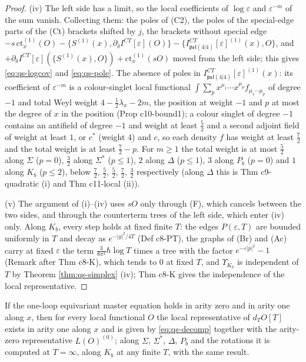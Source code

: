 \begin{proof}
(iv) The left side has a limit, so the local coefficients of $\log\varepsilon$ and $\varepsilon^{-m}$ of the sum vanish. Collecting them: the poles of (C2), the poles of the special-edge parts of the (Ct) brackets shifted by $j$, the brackets without special edge $-s\,\mathrm{ct}^{(1)}_x(O)-\{S^{(1)}(x),\partial_\delta I^{CT}[\varepsilon](O)\}-\{I^{CT}_{\mathfrak{psl}(4|4)}[\varepsilon]^{(1)}(x),O\}$, and $+\partial_\delta I^{CT}[\varepsilon](\{S^{(1)}(x),O\})+\mathrm{ct}^{(1)}_x(sO)$ moved from the left side; this gives \eqref{eq:qs-logcov} and \eqref{eq:qs-pole}. The absence of poles in $I^{CT}_{\mathfrak{psl}(4|4)}[\varepsilon]^{(1)}(x)$: its coefficient of $\varepsilon^{-m}$ is a colour-singlet local functional $\int\sum_px^{\mu_1}\cdots x^{\mu_p}f_{\mu_1\cdots\mu_p}$ of degree $-1$ and total Weyl weight $4-\tfrac12\lambda_x-2m$, the position at weight $-1$ and $p$ at most the degree of $x$ in the position (Prop c10-bound1); a colour singlet of degree $-1$ contains an antifield of degree $-1$ and weight at least $\tfrac52$ and a second adjoint field of weight at least $1$, or $c^*$ (weight $4$) and $c$, so each density $f$ has weight at least $\tfrac72$ and the total weight is at least $\tfrac72-p$. For $m\ge1$ the total weight is at most $\tfrac52$ along $\Sigma$ ($p=0$), $\tfrac32$ along $\Sigma^*$ ($p\le1$), $2$ along $\Delta$ ($p\le1$), $3$ along $P_b$ ($p=0$) and $1$ along $K_b$ ($p\le2$), below $\tfrac72$, $\tfrac52$, $\tfrac52$, $\tfrac72$, $\tfrac32$ respectively (along $\Delta$ this is Thm c9-quadratic (i) and Thm c11-local (ii)).

(v) The argument of (i)--(iv) uses $sO$ only through (F), which cancels between the two sides, and through the counterterm trees of the left side, which enter (iv) only. Along $K_b$, every step holds at fixed finite $T$: the edges $P(\varepsilon,T)$ are bounded uniformly in $T$ and decay as $e^{-|y|^2/4T}$ (Def c8-PT), the graphs of (Br) and (Ac) carry at fixed $\varepsilon$ the term $\tfrac3{8\pi^2}\hbar\log T$ times a tree with the factor $e^{-\varepsilon|p|^2}-1$ (Remark after Thm c8-K), which tends to $0$ at fixed $T$, and $\Upsilon_{K_b}$ is independent of $T$ by Theorem \ref{thm:qs-simplex} (iv); Thm c8-K gives the independence of the local representative.
\end{proof}

\begin{corollary}
\label{cor:qs-exist}
If the one-loop equivariant master equation holds in arity zero and in arity one along $x$, then for every local functional $O$ the local representative of $d_TO[T]$ exists in arity one along $x$ and is given by \eqref{eq:qs-decomp} together with the arity-zero representative $L(O)^{(0)}$; along $\Sigma$, $\Sigma^*$, $\Delta$, $P_b$ and the rotations it is computed at $T=\infty$, along $K_b$ at any finite $T$, with the same result.
\end{corollary}

